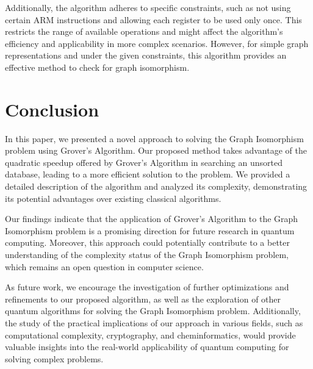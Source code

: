Additionally, the algorithm adheres to specific constraints, such as not using certain ARM instructions and allowing each register to be used only once. This restricts the range of available operations and might affect the algorithm's efficiency and applicability in more complex scenarios. However, for simple graph representations and under the given constraints, this algorithm provides an effective method to check for graph isomorphism.

\section{Conclusion}
In this paper, we presented a novel approach to solving the Graph Isomorphism problem using Grover's Algorithm. Our proposed method takes advantage of the quadratic speedup offered by Grover's Algorithm in searching an unsorted database, leading to a more efficient solution to the problem. We provided a detailed description of the algorithm and analyzed its complexity, demonstrating its potential advantages over existing classical algorithms.

Our findings indicate that the application of Grover's Algorithm to the Graph Isomorphism problem is a promising direction for future research in quantum computing. Moreover, this approach could potentially contribute to a better understanding of the complexity status of the Graph Isomorphism problem, which remains an open question in computer science.

As future work, we encourage the investigation of further optimizations and refinements to our proposed algorithm, as well as the exploration of other quantum algorithms for solving the Graph Isomorphism problem. Additionally, the study of the practical implications of our approach in various fields, such as computational complexity, cryptography, and cheminformatics, would provide valuable insights into the real-world applicability of quantum computing for solving complex problems.


